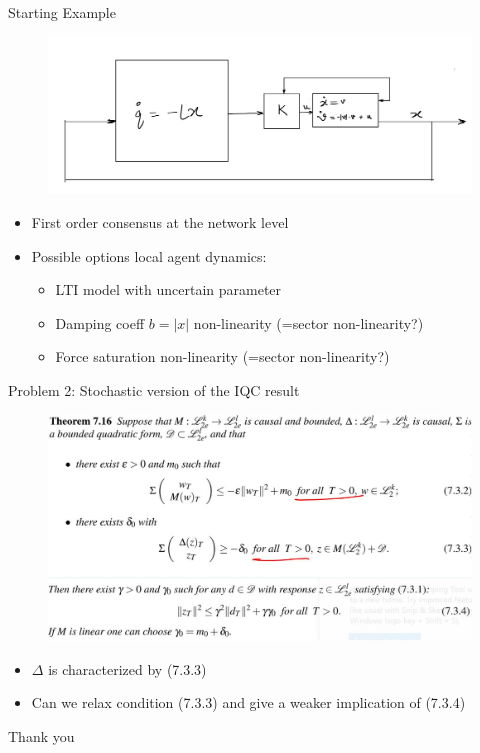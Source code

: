 \documentclass{beamer}
\begin{document}
\begin{frame}{Starting Example}
	\begin{figure}
		\includegraphics[width=1.0\linewidth]{figures/Starting_example.JPG}
		\label{fig:mjlstraj}
	\end{figure}
	\begin{itemize}
		\item First order consensus at the network level
		\item Possible options local agent dynamics:
			\begin{itemize}
				\item LTI model with uncertain parameter
				\item Damping coeff $b=|x|$ non-linearity (=sector non-linearity?)
				\item Force saturation non-linearity (=sector non-linearity?)
			\end{itemize} 						
	\end{itemize}
\end{frame}
\begin{frame}{Problem 2: Stochastic version of the IQC result}
\begin{minipage}{0.45\textwidth}
\vspace{4cm}
\end{minipage}
\begin{minipage}{0.45\textwidth}
	\begin{figure}
		\includegraphics[width=1.35\linewidth]{figures/hard_IQC_theorem.JPG}
		\label{fig:mjlstraj}
	\end{figure}
\end{minipage}	
	\begin{itemize}
		\item $\Delta$ is characterized by (7.3.3)
		\item Can we relax condition (7.3.3) and give a weaker implication of (7.3.4) 
	\end{itemize}
\end{frame}
\begin{frame}{}
\begin{center}
    \huge{Thank you}
\end{center}
\end{frame}
\end{document}
